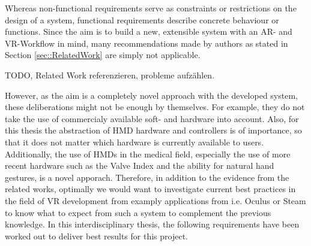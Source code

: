Whereas non-functional requirements serve as constraints or restrictions on the design of a system, functional requirements describe concrete behaviour or functions.
Since the aim is to build a new, extensible system with an AR- and VR-Workflow in mind, many recommendations made by authors as stated in Section \ref{sec::RelatedWork} are simply not applicable.

TODO, Related Work referenzieren, probleme aufzählen.

However, as the aim is a completely novel approach with the developed system, these deliberations might not be enough by themselves.
For example, they do not take the use of commercialy available soft- and hardware into account.
Also, for this thesis the abstraction of HMD hardware and controllers is of importance, so that it does not matter which hardware is currently available to users.
Additionally, the use of HMDs in the medical field, especially the use of more recent hardware such as the Valve Index and the ability for natural hand gestures, is a novel apporach.
Therefore, in addition to the evidence from the related works, optimally we would want to investigate current best practices in the field of VR development from examply applications from i.e. Oculus or Steam to know what to expect from such a system to complement the previous knowledge.
In this interdisciplinary thesis, the following requirements have been worked out to deliver best results for this project. 

